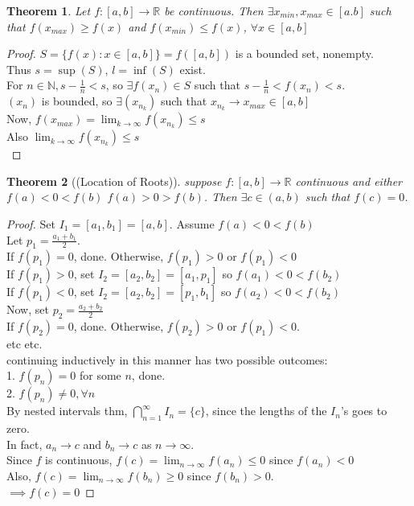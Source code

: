 \documentclass{report}
\newcommand{\N}{\mathbb{N}}  %
\newcommand{\bbR}{\mathbb{R}}  %
\newcommand{\xn}{(x_n)}
\newcommand{\xnkp}{(x_{n_k})}
\newcommand{\xnk}{x_{n_k}}
\theoremstyle{mystyle}
\newtheorem*{theorem}{Theorem}
\theoremstyle{customtheorem}
\begin{document}
    \begin{theorem}
        Let $f:[a,b]\to \bbR$ be continuous. Then $\exists x_{min}, x_{max} \in [a.b]$ such that $f(x_{max})\geq f(x)$ and $f(x_{min})\leq f(x)$, $\forall x\in[a,b]$
    \end{theorem}\vspace{-1.25em}
    \begin{proof}
        $S=\{f(x):x\in[a,b]\}=f([a,b])$ is a bounded set, nonempty.\\
        Thus $s=\sup(S)$, $l=\inf(S)$ exist. \\
        For $n\in \N, s-\frac{1}{n}<s$, so $\exists f(x_n)\in S$ such that $s-\frac{1}{n}<f(x_n)<s$.\\
        $\xn$ is bounded, so $\exists\xnkp$ such that $\xnk \to x_{max}\in[a,b]$\\
        Now, $f(x_{max})=\lim_{k\to\infty}f\xnkp\leq s$\\
        Also $\lim_{k\to\infty}f\xnkp\leq s$ \\
    \end{proof}

    \begin{theorem}[(Location of Roots)]
        suppose $f:[a,b]\to\bbR$ continuous and either $f(a)<0<f(b)$  $f(a)>0>f(b)$.
        Then $\exists c\in(a,b)$ such that $f(c)=0$.
    \end{theorem}
    \begin{proof}
        Set $I_1=[a_1,b_1]=[a,b]$. Assume $f(a)<0<f(b)$ \\
        Let $p_1=\frac{a_1+b_1}{2}$. \\
        If $f(p_1)=0$, done. Otherwise, $f(p_1) > 0$ or $f(p_1) < 0$\\
        If $f(p_1) > 0$, set $I_2=[a_2,b_2]=[a_1,p_1]$ so $f(a_1)<0<f(b_2)$ \\
        If $f(p_1) < 0$, set $I_2=[a_2,b_2]=[p_1,b_1]$ so $f(a_2)<0<f(b_2)$ \\
        Now, set $p_2=\frac{a_2+b_2}{2}$\\
        If $f(p_2)=0$, done. Otherwise, $f(p_2) > 0$ or $f(p_1) < 0$.\\
        etc etc. \\
        continuing inductively in this manner has two possible outcomes:\\
        1. $f(p_n)=0$ for some $n$, done.\\
        2. $f(p_n)\neq 0, \forall n$\\
        By nested intervals thm, $\bigcap_{n=1}^{\infty}I_n=\{c\}$, since the lengths of the $I_n$'s goes to zero. \\
        In fact, $a_n\to c$ and $b_n\to c$ as $n\to\infty$. \\
        Since $f$ is continuous, $f(c)=\lim_{n\to \infty}f(a_n)\leq 0$ since $f(a_n)<0$\\
        Also, $f(c)=\lim_{n\to \infty}f(b_n)\geq 0$ since $f(b_n)>0$. \\
        $\implies f(c)=0$
    \end{proof}
\end{document}
